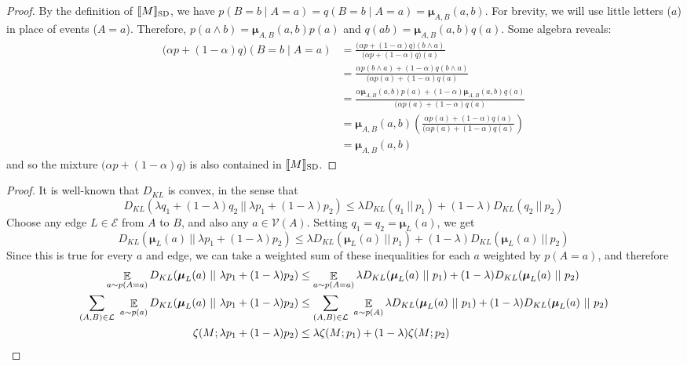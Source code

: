 \documentclass{article}
\newcommand\SD{_{\text{SD}}}
\newcommand{\bmu}{\boldsymbol{\mu}}
\newcommand{\Ed}{\mathcal E}
\numberwithin{equation}{section}
\begin{document}
\begin{notfocus}
\begin{proof}
		By the definition of $\bbr{M}\SD$, we have $p(B = b \mid A = a) = q(B = b \mid A = a) = \bmu_{A,B}(a,b)$.  
		For brevity, we will use little letters ($a$) in place of events ($A = a$).
		Therefore, $p(a\land b) = \bmu_{A,B}(a,b) p(a)$ and $q(ab) = \bmu_{A,B}(a,b) q(a)$. Some algebra reveals:
		\begin{align*}
			\Big( \alpha p + (1-\alpha) q \Big) (B = b \mid A = a) &= 
			\frac{\Big( \alpha p + (1-\alpha) q \Big) (b \land a)}{\Big( \alpha p + (1-\alpha) q \Big) (a)} \\
			&= \frac{ \alpha p(b \land a) + (1-\alpha) q(b \land a) }{\Big( \alpha p(a) + (1-\alpha) q (a)} \\
			&= \frac{ \alpha \bmu_{A,B}(a,b) p(a) + (1-\alpha) \bmu_{A,B}(a,b) q(a) }{\Big( \alpha p(a) + (1-\alpha) q (a)} \\
			&=\bmu_{A,B}(a,b) \left(\frac{ \alpha  p(a) + (1-\alpha) q(a) }{\Big( \alpha p(a) + (1-\alpha) q (a)}\right)\\
			&= \bmu_{A,B}(a,b)
		\end{align*}
		and so the mixture $\Big(\alpha p + (1-\alpha) q \Big)$ is also contained in $\bbr{M}\SD$.
	\end{proof}
	
	
	\thmzetaconvex*
	\begin{proof}
		It is well-known that $D_{KL}$ is convex, in the sense that 
		\[ D_{KL}(\lambda q_1 + (1-\lambda) q_2 \ ||\ \lambda p_1 + (1-\lambda) p_2) \leq \lambda D_{KL} (q_1\ ||\ p_1) + (1-\lambda) D_{KL}(q_2\ ||\ p_2) \]
		Choose any edge $L \in \Ed$ from $A$ to $B$, and also any $a \in \mathcal V(A)$. 
		Setting $q_1 = q_2 = \bmu_L(a)$, we get
		\[ D_{KL}(\bmu_L(a) \ ||\ \lambda p_1 + (1-\lambda) p_2) \leq \lambda D_{KL} (\bmu_L(a) \ ||\ p_1) + (1-\lambda) D_{KL}(\bmu_L(a)\ ||\ p_2) \]
		Since this is true for every $a$ and edge, we can take a weighted sum of these inequalities for each $a$ weighted by $p(A=a)$, and therefore
		\begin{align*}
			\E_{a\sim p(A=a)} D_{KL}(\bmu_L(a) \ ||\ \lambda p_1 + (1-\lambda) p_2) &\leq \E_{a\sim p(A=a)}\lambda D_{KL} (\bmu_L(a) \ ||\ p_1) + (1-\lambda) D_{KL}(\bmu_L(a)\ ||\ p_2) \\
			\sum_{(A, B) \in \cal L}~\E_{a\sim p(a)} D_{KL}(\bmu_L(a) \ ||\ \lambda p_1 + (1-\lambda) p_2) &\leq \sum_{(A, B) \in \cal L}~\E_{a\sim p(A)}\lambda D_{KL} (\bmu_L(a) \ ||\ p_1) + (1-\lambda) D_{KL}(\bmu_L(a)\ ||\ p_2) \\
			\zeta(M ; \lambda p_1 + (1-\lambda)p_2) &\leq \lambda \zeta(M;p_1) + (1-\lambda) \zeta(M;p_2)
		\end{align*}
	\end{proof}



\end{notfocus}
\end{document}
